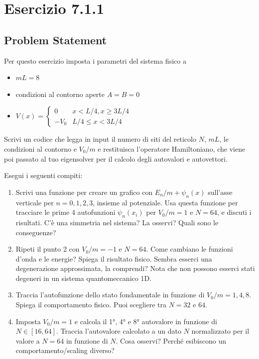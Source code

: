 

\section{Esercizio 7.1.1}   \label{Cap. Schr t-indep}
\subsection{Problem Statement}
Per questo esercizio imposta i parametri del sistema fisico a

\begin{itemize}
    \item $mL = 8$
    \item condizioni al contorno aperte $A = B = 0$
    \item $V(x) = \begin{cases} 0 & x < L/4, x \geq 3L/4 \\ -V_0 & L/4 \leq x < 3L/4 \end{cases}$
\end{itemize}

\noindent Scrivi un codice che legga in input il numero di siti del reticolo $N$, $mL$, le condizioni al contorno e $V_0/m$ e restituisca l'operatore Hamiltoniano, che viene poi passato al tuo eigensolver per il calcolo degli autovalori e autovettori.

\noindent Esegui i seguenti compiti:

\begin{enumerate}
    \item Scrivi una funzione per creare un grafico con $E_n/m + \psi_n(x)$ sull'asse verticale per $n = 0, 1, 2, 3$, insieme al potenziale. Usa questa funzione per tracciare le prime 4 autofunzioni $\psi_n(x_i)$ per $V_0/m = 1$ e $N = 64$, e discuti i risultati. C'è una simmetria nel sistema? La osservi? Quali sono le conseguenze?
    \item Ripeti il punto 2 con $V_0/m = -1$ e $N = 64$. Come cambiano le funzioni d'onda e le energie? Spiega il risultato fisico. Sembra esserci una degenerazione approssimata, la comprendi? Nota che non possono esserci stati degeneri in un sistema quantomeccanico 1D.
    \item Traccia l'autofunzione dello stato fondamentale in funzione di $V_0/m = 1, 4, 8$. Spiega il comportamento fisico. Puoi scegliere tra $N = 32$ e $64$.
    \item Imposta $V_0/m = 1$ e calcola il 1°, 4° e 8° autovalore in funzione di $N \in [16, 64]$. Traccia l'autovalore calcolato a un dato $N$ normalizzato per il valore a $N = 64$ in funzione di $N$. Cosa osservi? Perché esibiscono un comportamento/scaling diverso?
    
\end{enumerate}



